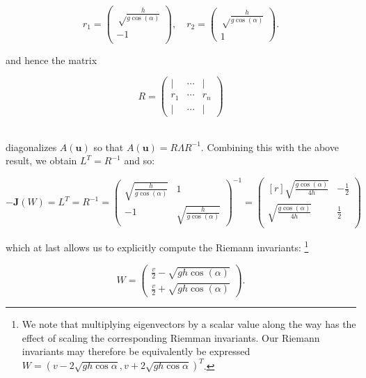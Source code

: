 $$
r_1 = \begin{pmatrix}
    \sqrt\frac{h}{g \cos{(\alpha)}} \\
    -1 \\
\end{pmatrix}, \quad r_2 = \begin{pmatrix}
    \sqrt\frac{h}{g \cos{(\alpha)}} \\
    1
\end{pmatrix}.
$$

\noindent and hence the matrix 

$$
R = \begin{pmatrix}
    \vert & \cdots & \vert \\
    r_1   & \cdots & r_n   \\
    \vert & \cdots & \vert
\end{pmatrix}
$$

\ \\
\noindent diagonalizes $A(\textbf{u})$ so that $A(\textbf{u}) = R \Lambda R^{-1}$. Combining this with the above result,
we obtain $L^T = R^{-1}$ and so:

\[\renewcommand\arraystretch{2}
-\textbf{J}(W) = L^T = R^{-1} = \begin{pmatrix}
    \sqrt{\frac{h}{g \cos{(\alpha)}}} & 1 \\
    -1                                & \sqrt{\frac{h}{g \cos{(\alpha)}}}
\end{pmatrix}^{-1} = \begin{pmatrix*}[r]
    \sqrt{\frac{g \cos{(\alpha)}}{4h}} & -\frac{1}{2} \\
    \sqrt{\frac{g \cos{(\alpha)}}{4h}} &  \frac{1}{2} \\
\end{pmatrix*}
\]

\pagebreak

\noindent which at last allows us to explicitly compute the Riemann invariants: \footnote{
    We note that multiplying eigenvectors by a scalar value along the way has the effect of scaling the corresponding 
    Riemman invariants. Our Riemann invariants may therefore be equivalently be expressed \linebreak
    $W = (v - 2 \sqrt{gh \cos{\alpha}}, v + 2 \sqrt{gh \cos{\alpha}})^T$.
}

\[\renewcommand\arraystretch{2}
W = \begin{pmatrix}
    \frac{v}{2} - \sqrt{g h \cos{(\alpha)}} \\ 
    \frac{v}{2} + \sqrt{g h \cos{(\alpha)}} 
\end{pmatrix}.
\]
